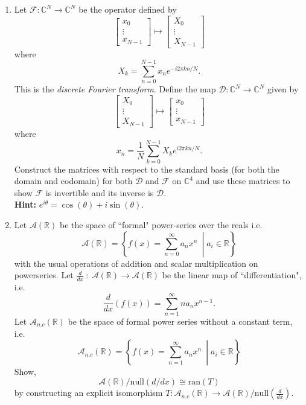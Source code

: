 \documentclass[12pt,letterpaper]{article}
\theoremstyle{plain}
\theoremstyle{definition}
\begin{document}
\begin{enumerate}[{\bf1.}]
\item Let $\mathcal{F}:\mathbb{C}^N\rightarrow \mathbb{C}^N$ be the operator defined by 
\[\begin{bmatrix}x_0\\ \vdots\\ x_{N-1}\end{bmatrix} \mapsto \begin{bmatrix}X_0\\ \vdots\\ X_{N-1}\end{bmatrix}\]
where 
\[X_k=\sum_{n=0}^{N-1}x_ne^{-i2\pi kn/ N}.\]
This is the \emph{discrete Fourier transform}. Define the map $\mathcal{D}:\mathbb{C}^N\rightarrow \mathbb{C}^N$ given by
\[\begin{bmatrix}X_0\\ \vdots\\ X_{N-1}\end{bmatrix}\mapsto \begin{bmatrix}x_0\\ \vdots\\ x_{N-1}\end{bmatrix}\]
where 
\[x_n=\frac{1}{N}\sum_{k=0}^{N-1}X_ke^{i2\pi kn/ N}.\]
Construct the matrices with respect to the standard basis (for both the domain and codomain) for both $\mathcal{D}$ and $\mathcal{F}$ on $\mathbb{C}^4$ and use these matrices to show $\mathcal{F}$ is invertible and its inverse is $\mathcal{D}$. \\

{\bf \noindent Hint: }$e^{i\theta}=\cos(\theta)+i\sin(\theta)$.\\

\item Let $\mathcal{A}(\mathbb{R})$ be the space of ``formal" power-series over the reals i.e. 
\[\mathcal{A}(\mathbb{R})=\left\{f(x)=\sum_{n=0}^\infty a_nx^n\ \middle| a_i\in\mathbb{R}\right\} \]
with the usual operations of addition and scalar multiplication on powerseries. 
Let $\frac{d}{dx}~:~\mathcal{A}(\mathbb{R})\rightarrow \mathcal{A}(\mathbb{R})$ be the linear map of  ``differentiation", i.e. 
\[\frac{d}{dx}(f(x))=\sum_{n=1}^\infty na_nx^{n-1}.\]
Let $\mathcal{A}_{n.c}(\mathbb{R})$ be the space of formal power series without a constant term, i.e. 
\[\mathcal{A}_{n.c}(\mathbb{R})=\left\{f(x)=\sum_{n=1}^\infty a_nx^n\ \middle| a_i\in\mathbb{R}\right\} \]
Show,
\[\mathcal{A}(\mathbb{R})/\text{null}\left(d/dx\right)\cong \text{ran}(T)\]
by constructing an explicit isomorphism $T:\mathcal{A}_{n.c}(\mathbb{R})\rightarrow\mathcal{A}(\mathbb{R})/\text{null}(\frac{d}{dx})$.\\


\end{enumerate}
\end{document}
